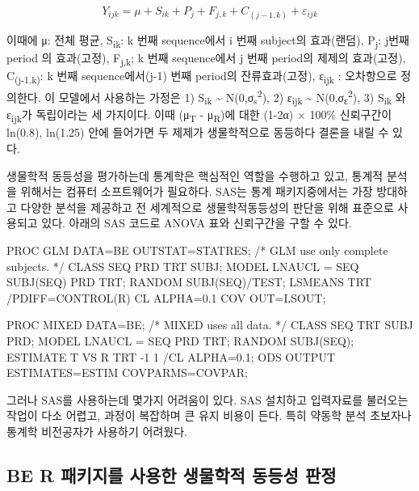 \documentclass[
  11pt,
  krantz2, a4paper, twoside]{krantz}
\newenvironment{Shaded}{\begin{snugshade}}{\end{snugshade}}
\newcommand{\NormalTok}[1]{#1}
\theoremstyle{definition}
\theoremstyle{definition}
\theoremstyle{definition}
\theoremstyle{definition}
\theoremstyle{remark}
\begin{document}
\[
Y_{ijk} = \mu + S_{ik} + P_{j} + F_{j,k} + C_{(j-1,k)} + \varepsilon_{ijk}
\]

이때에 μ: 전체 평균, S\textsubscript{ik}: k 번째 sequence에서 i 번째 subject의 효과(랜덤), P\textsubscript{j}: j번째 period 의 효과(고정), F\textsubscript{j,k}; k 번째 sequence에서 j 번째 period의 제제의 효과(고정), C\textsubscript{(j-1,k)}: k 번째 sequence에서(j-1) 번째 period의 잔류효과(고정), ε\textsubscript{ijk} : 오차항으로 정의한다.
이 모델에서 사용하는 가정은 1) S\textsubscript{ik} \textasciitilde{} N(0,σ\textsubscript{s}\textsuperscript{2}), 2) ε\textsubscript{ijk} \textasciitilde{} N(0,σ\textsubscript{ε}\textsuperscript{2}), 3) S\textsubscript{ik} 와 ε\textsubscript{ijk}가 독립이라는 세 가지이다. 이때 (μ\textsubscript{T} - μ\textsubscript{R})에 대한 (1-2α) × 100\% 신뢰구간이 ln(0.8), ln(1.25) 안에 들어가면 두 제제가 생물학적으로 동등하다 결론을 내릴 수 있다.

생물학적 동등성을 평가하는데 통계학은 핵심적인 역할을 수행하고 있고, 통계적 분석을 위해서는 컴퓨터 소프트웨어가 필요하다. SAS는 통계 패키지중에서는 가장 방대하고 다양한 분석을 제공하고 전 세계적으로 생물학적동등성의 판단을 위해 표준으로 사용되고 있다. 아래의 SAS 코드로 ANOVA 표와 신뢰구간을 구할 수 있다.

\begin{Shaded}
\begin{Highlighting}[]
\NormalTok{PROC GLM DATA=BE OUTSTAT=STATRES; /* GLM use only complete subjects. */}
\NormalTok{CLASS SEQ PRD TRT SUBJ;}
\NormalTok{MODEL LNAUCL = SEQ SUBJ(SEQ) PRD TRT;}
\NormalTok{RANDOM SUBJ(SEQ)/TEST;}
\NormalTok{LSMEANS TRT /PDIFF=CONTROL(\textquotesingle{}R\textquotesingle{}) CL ALPHA=0.1 COV OUT=LSOUT;}

\NormalTok{PROC MIXED DATA=BE; /* MIXED uses all data. */}
\NormalTok{CLASS SEQ TRT SUBJ PRD;}
\NormalTok{MODEL LNAUCL = SEQ PRD TRT;}
\NormalTok{RANDOM SUBJ(SEQ);}
\NormalTok{ESTIMATE \textquotesingle{}T VS R\textquotesingle{} TRT {-}1 1 /CL ALPHA=0.1;}
\NormalTok{ODS OUTPUT ESTIMATES=ESTIM COVPARMS=COVPAR;}
\end{Highlighting}
\end{Shaded}

그러나 SAS를 사용하는데 몇가지 어려움이 있다. SAS 설치하고 입력자료를 불러오는 작업이 다소 어렵고, 과정이 복잡하며 큰 유지 비용이 든다. 특히 약동학 분석 초보자나 통계학 비전공자가 사용하기 어려웠다. 

\hypertarget{be-r-uxd328uxd0a4uxc9c0uxb97c-uxc0acuxc6a9uxd55c-uxc0dduxbb3cuxd559uxc801-uxb3d9uxb4f1uxc131-uxd310uxc815}{%
\subsection{\texorpdfstring{BE R 패키지를 사용한 생물학적 동등성 판정}{BE R 패키지를 사용한 생물학적 동등성 판정}}\label{be-r-uxd328uxd0a4uxc9c0uxb97c-uxc0acuxc6a9uxd55c-uxc0dduxbb3cuxd559uxc801-uxb3d9uxb4f1uxc131-uxd310uxc815}}
\end{document}
